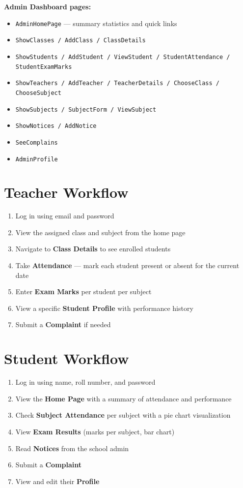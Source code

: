 \documentclass[12pt,a4paper]{report}
\begin{document}
\textbf{Admin Dashboard pages:}
\begin{itemize}[leftmargin=2em]
  \item \texttt{AdminHomePage} --- summary statistics and quick links
  \item \texttt{ShowClasses / AddClass / ClassDetails}
  \item \texttt{ShowStudents / AddStudent / ViewStudent / StudentAttendance / StudentExamMarks}
  \item \texttt{ShowTeachers / AddTeacher / TeacherDetails / ChooseClass / ChooseSubject}
  \item \texttt{ShowSubjects / SubjectForm / ViewSubject}
  \item \texttt{ShowNotices / AddNotice}
  \item \texttt{SeeComplains}
  \item \texttt{AdminProfile}
\end{itemize}

\section{Teacher Workflow}

\begin{enumerate}[leftmargin=2em]
  \item Log in using email and password
  \item View the assigned class and subject from the home page
  \item Navigate to \textbf{Class Details} to see enrolled students
  \item Take \textbf{Attendance} --- mark each student present or absent for the current date
  \item Enter \textbf{Exam Marks} per student per subject
  \item View a specific \textbf{Student Profile} with performance history
  \item Submit a \textbf{Complaint} if needed
\end{enumerate}

\section{Student Workflow}

\begin{enumerate}[leftmargin=2em]
  \item Log in using name, roll number, and password
  \item View the \textbf{Home Page} with a summary of attendance and performance
  \item Check \textbf{Subject Attendance} per subject with a pie chart visualization
  \item View \textbf{Exam Results} (marks per subject, bar chart)
  \item Read \textbf{Notices} from the school admin
  \item Submit a \textbf{Complaint}
  \item View and edit their \textbf{Profile}
\end{enumerate}
\end{document}
